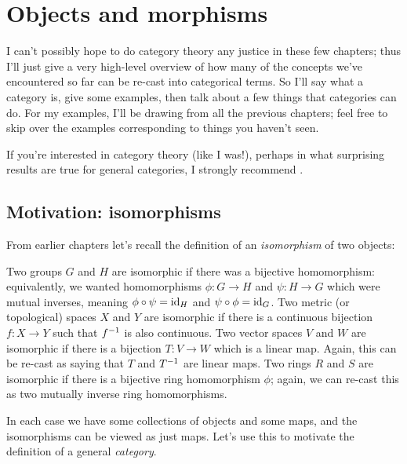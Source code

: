 \chapter{Objects and morphisms}
\label{ch:cats}
I can't possibly hope to do category theory any justice in these few chapters;
thus I'll just give a very high-level overview of how many of the concepts we've
encountered so far can be re-cast into categorical terms.
So I'll say what a category is, give some examples,
then talk about a few things that categories can do.
For my examples, I'll be drawing from all the previous chapters;
feel free to skip over the examples corresponding to things you haven't seen.

If you're interested in category theory (like I was!), perhaps in
what surprising results are true for general categories, I strongly recommend \cite{ref:msci}.

\section{Motivation: isomorphisms}
From earlier chapters let's recall the definition of an \emph{isomorphism} of two objects:
\begin{itemize}
	\ii Two groups $G$ and $H$ are isomorphic if there was a bijective homomorphism:
	equivalently, we wanted homomorphisms $\phi \colon G \to H$ and $\psi \colon H \to G$
	which were mutual inverses, meaning $\phi \circ \psi = \mathrm{id}_H$ and $\psi \circ \phi = \mathrm{id}_G$.
	\ii Two metric (or topological) spaces $X$ and $Y$ are isomorphic
	if there is a continuous bijection $f \colon X \to Y$ such that $f^{-1}$ is also continuous.
	\ii Two vector spaces $V$ and $W$ are isomorphic if there is a bijection $T \colon V \to W$
	which is a linear map.
	Again, this can be re-cast as saying that $T$ and $T^{-1}$ are linear maps.
	\ii Two rings $R$ and $S$ are isomorphic if there is a bijective ring homomorphism $\phi$;
	again, we can re-cast this as two mutually inverse ring homomorphisms.
\end{itemize}

In each case we have some collections of objects and some maps,
and the isomorphisms can be viewed as just maps.
Let's use this to motivate the definition of a general \emph{category}.

